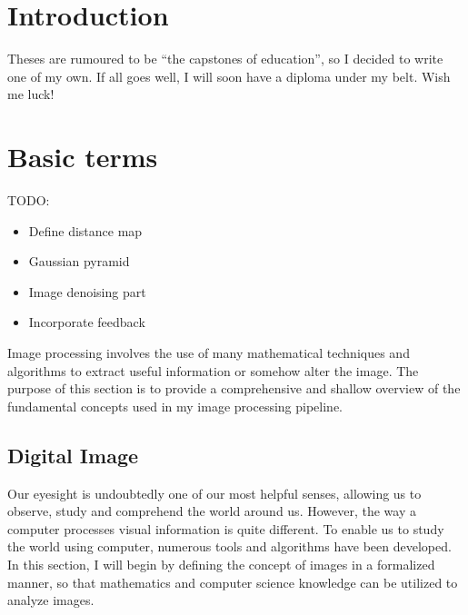 \documentclass[
  digital,     %
  oneside,     %
  nosansbold,  %
  nocolorbold, %
  lof,         %
  lot,         %
]{fithesis4}
\begin{document}
\chapter*{Introduction}

Theses are rumoured to be \enquote{the capstones of education}, so
I decided to write one of my own. If all goes well, I will soon
have a diploma under my belt. Wish me luck!

\chapter{Basic terms}

TODO:
\begin{itemize}
    \item{Define distance map}
    \item{Gaussian pyramid}
    \item{Image denoising part}
    \item{Incorporate feedback}
\end{itemize}

Image processing involves the use of many mathematical techniques and algorithms
to extract useful information or somehow alter the image. The purpose of this
section is to provide a comprehensive and shallow overview of the fundamental
concepts used in my image processing pipeline.

\section{Digital Image}
Our eyesight is undoubtedly one of our most helpful senses, allowing us to
observe, study and comprehend the world around us. However, the way a computer
processes visual information is quite different. To enable us to study the world
using computer, numerous tools and algorithms have been developed. In this
section, I will begin by defining the concept of images in a formalized manner,
so that mathematics and computer science knowledge can be utilized to analyze
images.
\end{document}
